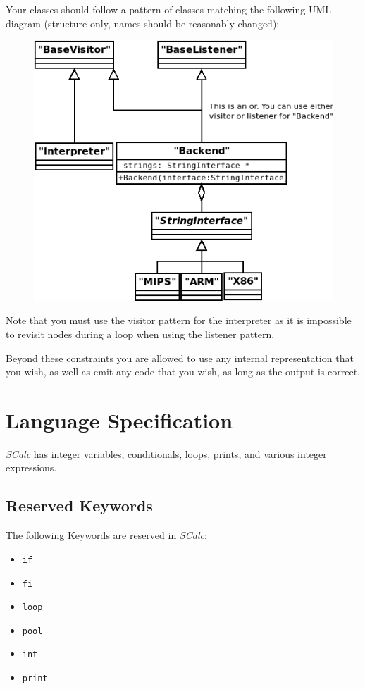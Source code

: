 \documentclass{article}
\newcommand{\code}[1]{\texttt{\textmd{#1}}}
\begin{document}
Your classes should follow a pattern of classes matching the following UML diagram (structure only,
names should be reasonably changed):
\begin{figure}[H]
  \centering
  \includegraphics{static/expectedForm.png}
\end{figure}

Note that you must use the visitor pattern for the interpreter as it is impossible to revisit nodes
during a loop when using the listener pattern.

Beyond these constraints you are allowed to use any internal representation that you wish, as well
as emit any code that you wish, as long as the output is correct.

\section{Language Specification}
\textit{SCalc} has integer variables, conditionals, loops, prints, and various integer expressions.

\subsection{Reserved Keywords}
The following Keywords are reserved in \textit{SCalc}:
\begin {itemize}
  \item{\code{if}}
  \item{\code{fi}}
  \item{\code{loop}}
  \item{\code{pool}}
  \item{\code{int}}
  \item{\code{print}}
\end {itemize}
\end{document}
